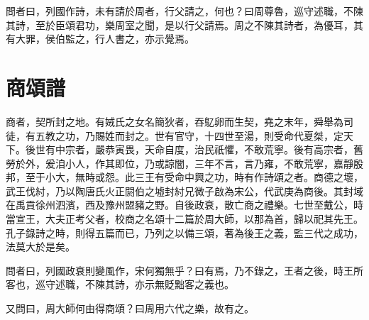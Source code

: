 問者曰，列國作詩，未有請於周者，行父請之，何也？曰周尊魯，巡守述職，不陳其詩，至於臣頌君功，樂周室之聞，是以行父請焉。周之不陳其詩者，為優耳，其有大罪，侯伯監之，行人書之，亦示覺焉。

\section*{商頌譜}

商者，契所封之地。有娀氏之女名簡狄者，吞鳦卵而生契，堯之末年，舜舉為司徒，有五教之功，乃賜姓而封之。世有官守，十四世至湯，則受命代夏桀，定天下。後世有中宗者，嚴恭寅畏，天命自度，治民祇懼，不敢荒寧。後有高宗者，舊勞於外，爰洎小人，作其即位，乃或諒闇，三年不言，言乃雍，不敢荒寧，嘉靜殷邦，至于小大，無時或怨。此三王有受命中興之功，時有作詩頌之者。商德之壞，武王伐紂，乃以陶唐氏火正閼伯之墟封紂兄微子啟為宋公，代武庚為商後。其封域在禹貢徐州泗濱，西及豫州盟豬之野。自後政衰，散亡商之禮樂。七世至戴公，時當宣王，大夫正考父者，校商之名頌十二篇於周大師，以那為首，歸以祀其先王。孔子錄詩之時，則得五篇而已，乃列之以備三頌，著為後王之義，監三代之成功，法莫大於是矣。

問者曰，列國政衰則變風作，宋何獨無乎？曰有焉，乃不錄之，王者之後，時王所客也，巡守述職，不陳其詩，亦示無貶黜客之義也。

又問曰，周大師何由得商頌？曰周用六代之樂，故有之。